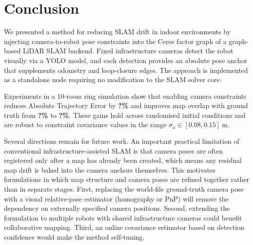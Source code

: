 \section{Conclusion}
\label{sec:conclusion}


We presented a method for reducing SLAM drift in indoor environments by
injecting camera-to-robot pose constraints into the Ceres factor graph of
a graph-based LiDAR SLAM backend.
Fixed infrastructure cameras detect the robot visually via a YOLO model,
and each detection provides an absolute pose anchor that supplements
odometry and loop-closure edges.
The approach is implemented as a standalone node requiring no
modification to the SLAM solver core.

Experiments in a 10-room ring simulation show that enabling camera
constraints reduces Absolute Trajectory Error by \textbf{?\%} and
improves map overlap with ground truth from \textbf{?\%} to
\textbf{?\%}.
These gains hold across randomised initial conditions and are robust to
constraint covariance values in the range
$\sigma_x \in [0.08, 0.15]\ \si{\metre}$.

Several directions remain for future work.
An important practical limitation of conventional infrastructure-assisted SLAM
is that camera poses are often registered only after a map has already been
created, which means any residual map drift is baked into the camera anchors
themselves. This motivates formulations in which map structure and camera
poses are refined together rather than in separate stages.
First, replacing the world-file ground-truth camera pose with a visual
relative-pose estimator (homography or PnP) will remove the dependency on
externally specified camera positions.
Second, extending the formulation to multiple robots with shared
infrastructure cameras could benefit collaborative mapping. %
Third, an online covariance estimator based on detection confidence would
make the method self-tuning.
